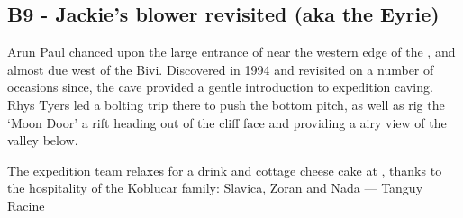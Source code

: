 \subsection{B9 - Jackie's blower revisited (aka the Eyrie)}
Arun Paul chanced upon the large entrance of  near the western edge of the , and almost due west of the Bivi. Discovered in 1994 and revisited on a number of occasions since, the cave provided a gentle introduction to expedition caving. Rhys Tyers led a bolting trip there to push the bottom pitch, as well as rig the `Moon Door' a rift heading out of the cliff face and providing a airy view of the  valley below.

 

\begin{pagefigure}
\checkoddpage \ifoddpage \forcerectofloat \else \forceversofloat \fi
\centering
{}
\caption{The expedition team relaxes for a drink and cottage cheese cake at , thanks to the hospitality of the Koblucar family: Slavica, Zoran and Nada --- Tanguy Racine}
\label{End of the expedition}
\end{pagefigure}

